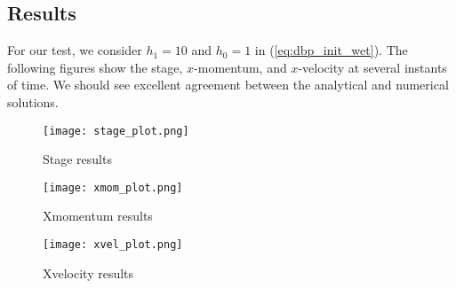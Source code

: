 \subsection{Results}

For our test, we consider $h_1=10$ and $h_0=1$ in (\ref{eq:dbp_init_wet}).
The following figures show the stage, $x$-momentum, and $x$-velocity at several instants of time.
We should see excellent agreement between the analytical and numerical solutions. 

\begin{figure}
\begin{center}
\texttt{[image: stage\_plot.png]}
\end{center}
\caption{Stage results}
\end{figure}


\begin{figure}
\begin{center}
\texttt{[image: xmom\_plot.png]}
\end{center}
\caption{Xmomentum results}
\end{figure}


\begin{figure}
\begin{center}
\texttt{[image: xvel\_plot.png]}
\end{center}
\caption{Xvelocity results}
\end{figure}


\endinput
